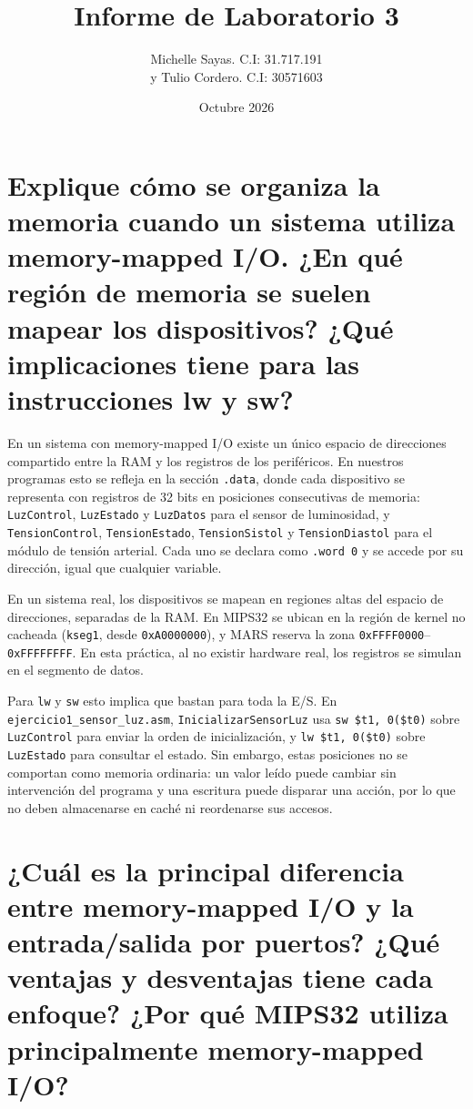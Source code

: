 \documentclass[12pt,a4paper]{article}
\title{Informe de Laboratorio 3}
\author{Michelle Sayas. C.I: 31.717.191 \\ y Tulio Cordero. C.I: 30571603}
\date{Octubre 2026}
\begin{document}
\maketitle

\section{Explique cómo se organiza la memoria cuando un sistema utiliza memory-mapped I/O. ¿En qué región de memoria se suelen mapear los dispositivos? ¿Qué implicaciones tiene para las instrucciones lw y sw?}

En un sistema con memory-mapped I/O existe un único espacio de direcciones compartido entre la RAM y los registros de los periféricos. En nuestros programas esto se refleja en la sección \texttt{.data}, donde cada dispositivo se representa con registros de 32 bits en posiciones consecutivas de memoria: \texttt{LuzControl}, \texttt{LuzEstado} y \texttt{LuzDatos} para el sensor de luminosidad, y \texttt{TensionControl}, \texttt{TensionEstado}, \texttt{TensionSistol} y \texttt{TensionDiastol} para el módulo de tensión arterial. Cada uno se declara como \texttt{.word 0} y se accede por su dirección, igual que cualquier variable.

En un sistema real, los dispositivos se mapean en regiones altas del espacio de direcciones, separadas de la RAM. En MIPS32 se ubican en la región de kernel no cacheada (\texttt{kseg1}, desde \texttt{0xA0000000}), y MARS reserva la zona \texttt{0xFFFF0000}--\texttt{0xFFFFFFFF}. En esta práctica, al no existir hardware real, los registros se simulan en el segmento de datos.

Para \texttt{lw} y \texttt{sw} esto implica que bastan para toda la E/S. En \texttt{ejercicio1\_sensor\_luz.asm}, \texttt{InicializarSensorLuz} usa \texttt{sw \$t1, 0(\$t0)} sobre \texttt{LuzControl} para enviar la orden de inicialización, y \texttt{lw \$t1, 0(\$t0)} sobre \texttt{LuzEstado} para consultar el estado. Sin embargo, estas posiciones no se comportan como memoria ordinaria: un valor leído puede cambiar sin intervención del programa y una escritura puede disparar una acción, por lo que no deben almacenarse en caché ni reordenarse sus accesos.

\section{¿Cuál es la principal diferencia entre memory-mapped I/O y la entrada/salida por puertos? ¿Qué ventajas y desventajas tiene cada enfoque? ¿Por qué MIPS32 utiliza principalmente memory-mapped I/O?}
\end{document}

